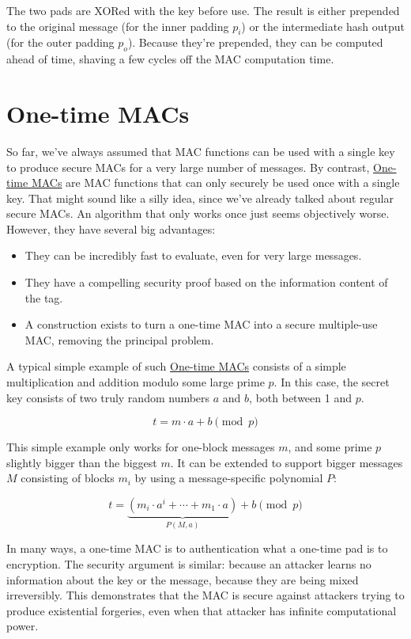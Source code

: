 \documentclass[11pt,ebook,table,dvipsnames]{memoir}
\begin{document}
The two pads are XORed with the key before use. The result is either
prepended to the original message (for the inner padding $p_i$) or the
intermediate hash output (for the outer padding $p_o$). Because
they're prepended, they can be computed ahead of time, shaving a few
cycles off the MAC computation time.
\section{\label{One-time-MACs}One-time MACs}
\label{sec-2-7-5}

So far, we've always assumed that MAC functions can be used with a
single key to produce secure MACs for a very large number of messages.
By contrast, \hyperref[one-time-MACs]{One-time MACs} are MAC functions that can only securely be
used once with a single key. That might sound like a silly idea, since
we've already talked about regular secure MACs. An algorithm that only
works once just seems objectively worse. However, they have several big
advantages:

\begin{itemize}
\item They can be incredibly fast to evaluate, even for very large
messages.
\item They have a compelling security proof based on the information
content of the tag.
\item A construction exists to turn a one-time MAC into a secure
multiple-use MAC, removing the principal problem.
\end{itemize}

A typical simple example of such \hyperref[one-time-MACs]{One-time MACs} consists of a simple
multiplication and addition modulo some large prime $p$. In this case,
the secret key consists of two truly random numbers $a$ and $b$, both
between 1 and $p$.

\[
t = m \cdot a + b \pmod p
\]

This simple example only works for one-block messages $m$, and some
prime $p$ slightly bigger than the biggest $m$. It can be extended to
support bigger messages $M$ consisting of blocks $m_i$ by using a
message-specific polynomial $P$:

\[
t = \underbrace{(m_i \cdot a^i + \cdots + m_1 \cdot a)}_{P(M, a)} + b \pmod p
\]

In many ways, a one-time MAC is to authentication what a one-time pad
is to encryption. The security argument is similar: because an
attacker learns no information about the key or the message, because
they are being mixed irreversibly. This demonstrates that the MAC is
secure against attackers trying to produce existential forgeries, even
when that attacker has infinite computational power.
\end{document}
